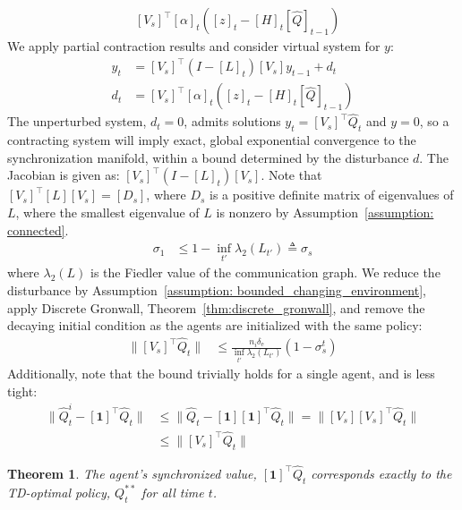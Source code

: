\documentclass[journal]{IEEEtran}
\newtheorem{theorem}{Theorem}
\begin{document}
\begin{IEEEproof}
\begin{align*}
            & [V_s]^\intercal [\alpha]_t ( [z]_t - [H]_t [\hat{Q}]_{t-1})
    \end{align*}
    We apply partial contraction results and consider virtual system for $y$:
    \begin{align*}
        y_t &= [V_s]^\intercal ( I - [L]_t)[V_s] y_{t-1} + d_t \\ 
        d_t &= [V_s]^\intercal [\alpha]_t ( [z]_t - [H]_t [\hat{Q}]_{t-1})
    \end{align*}
    The unperturbed system, $d_t = 0$, admits solutions $y_t = [V_s]^\intercal \hat{Q}_{t}$ and $y = 0$, so a contracting system will imply exact, global exponential convergence to the synchronization manifold, within a bound determined by the disturbance $d$. The Jacobian is given as: $ [V_s]^\intercal ( I - [L]_t) [V_s]$. Note that $[V_s]^\intercal [L][V_s] = [D_s]$, where $D_s$ is a positive definite matrix of eigenvalues of $L$, where the smallest eigenvalue of $L$ is nonzero by Assumption~\ref{assumption: connected}.
    \begin{align*}
        \sigma_1 &\leq 1 - \inf_{t'} \lambda_2(L_{t'}) \triangleq \sigma_s
    \end{align*}
    where $\lambda_2(L)$ is the Fiedler value of the communication graph. We reduce the disturbance by Assumption~\ref{assumption: bounded_changing_environment}, apply Discrete Gronwall, Theorem~\ref{thm:discrete_gronwall}, and remove the decaying initial condition as the agents are initialized with the same policy:
    \begin{align*}
        \| [V_s]^\intercal \hat{Q}_{t} \| &\leq \frac{ n_i \delta_\mathrm{e}}{ \inf_{t'} \lambda_2(L_{t'})}( 1 - \sigma_s^t)
    \end{align*}
    Additionally, note that the bound trivially holds for a single agent, and is less tight:
    \begin{align*}
        \| \hat{Q}_t^i - [\boldsymbol{1}]^\intercal \hat{Q}_t\| & \leq \| \hat{Q}_t - [\boldsymbol{1}] [\boldsymbol{1}]^\intercal \hat{Q}_t\| = \|[V_s] [V_s]^\intercal \hat{Q}_t\| \\
        &\leq \|[V_s]^\intercal \hat{Q}_t\| 
    \end{align*}
\end{IEEEproof}

\begin{theorem}
    \label{result:tracking}
    The agent's synchronized value, $[\boldsymbol{1}]^\intercal \hat{Q}_t$ corresponds exactly to the TD-optimal policy, $Q^{**}_t$ for all time $t$. 
\end{theorem}
\end{document}
